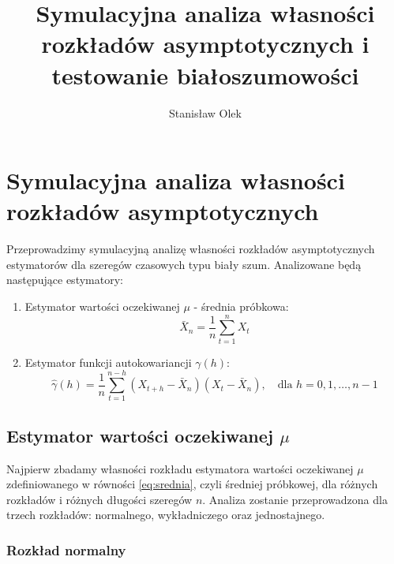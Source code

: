 \documentclass[10pt, a4paper]{article}\usepackage[]{graphicx}\usepackage[]{xcolor}
\begin{document}

\title{Symulacyjna analiza własności rozkładów asymptotycznych i testowanie białoszumowości}
\author{Stanisław Olek}
\maketitle
\tableofcontents

\section{Symulacyjna analiza własności rozkładów asymptotycznych}

Przeprowadzimy symulacyjną analizę własności rozkładów asymptotycznych estymatorów dla szeregów czasowych typu biały szum. Analizowane będą następujące estymatory:

\begin{enumerate}
  \item Estymator wartości oczekiwanej $\mu$ - średnia próbkowa:
  \begin{equation}
  \bar{X}_n=\frac{1}{n}\sum_{t=1}^n X_t
  \label{eq:srednia}
  \end{equation}
  
  \item Estymator funkcji autokowariancji $\gamma(h)$:
  \begin{equation}
  \hat{\gamma}(h)=\frac{1}{n}\sum_{t=1}^{n-h}(X_{t+h}-\bar{X}_n)(X_t-\bar{X}_n), \quad \text{dla } h=0,1,\ldots,n-1
  \label{eq:autokowariancja}
  \end{equation}
  
\end{enumerate}


\subsection{Estymator wartości oczekiwanej $\mu$}
Najpierw zbadamy własności rozkładu estymatora wartości oczekiwanej $\mu$ zdefiniowanego w równości \eqref{eq:srednia}, czyli średniej próbkowej, dla różnych rozkładów i różnych długości szeregów $n$. Analiza zostanie przeprowadzona dla trzech rozkładów: normalnego, wykładniczego oraz jednostajnego.

\newpage
\subsubsection{Rozkład normalny}
\end{document}
